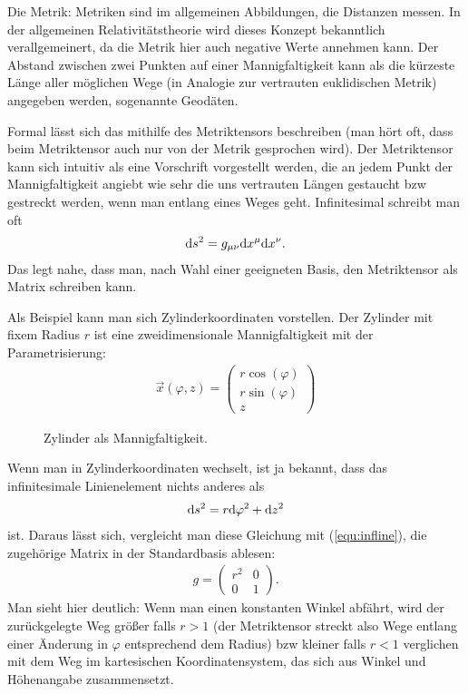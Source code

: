 \documentclass{scrartcl}
\begin{document}
		\begin{paragraph}{Die Metrik:} Metriken sind im allgemeinen Abbildungen, die Distanzen messen. In der allgemeinen
			Relativitätstheorie wird dieses Konzept bekanntlich verallgemeinert, da die Metrik hier auch negative
			Werte annehmen kann. Der Abstand zwischen zwei Punkten auf einer Mannigfaltigkeit kann als die kürzeste Länge 
			aller möglichen Wege (in Analogie zur vertrauten euklidischen Metrik) angegeben werden, sogenannte Geodäten.
			
			Formal lässt sich das mithilfe des Metriktensors beschreiben (man hört oft, dass beim Metriktensor auch nur von
			der Metrik gesprochen wird). Der Metriktensor kann sich intuitiv als eine Vorschrift vorgestellt werden, die an jedem
			Punkt der Mannigfaltigkeit angiebt wie sehr die uns vertrauten Längen gestaucht bzw gestreckt werden, wenn 
			man entlang eines Weges geht. Infinitesimal schreibt man oft
			\begin{align}
				{\rm d}s^2=g_{\mu\nu} {\rm d}x^\mu{\rm d}x^\nu.
				\label{equ:infline}
			\end{align}
			Das legt nahe, dass man, nach Wahl einer geeigneten Basis, den Metriktensor als Matrix schreiben kann.
			
			Als Beispiel kann man sich Zylinderkoordinaten vorstellen. Der Zylinder mit fixem Radius $r$ ist eine 
			zweidimensionale Mannigfaltigkeit mit der Parametrisierung:
			\begin{align}
				\vec{x}(\varphi,z)=\left( 
				\begin{array}{c}
				r\cos(\varphi)\\
				r\sin(\varphi)\\
				z
				\end{array}
				\right)
			\end{align}
			\begin{figure}
				\centering
				
				\caption{Zylinder als Mannigfaltigkeit.}
			\end{figure}
			Wenn man in Zylinderkoordinaten wechselt, ist ja bekannt, dass das infinitesimale Linienelement nichts anderes als
			\begin{align*}
				{\rm d}s^2=r{\rm d}\varphi^2 + {\rm d}z^2
			\end{align*}
			ist. Daraus lässt sich, vergleicht man diese Gleichung mit (\ref{equ:infline}), die zugehörige Matrix in der Standardbasis ablesen:
			\begin{align*}
				g=\left(\begin{array}{ccc} r^2 & 0\\0 & 1 \end{array}\right).
			\end{align*}
			Man sieht hier deutlich: Wenn man einen konstanten Winkel abfährt, wird der zurückgelegte Weg größer falls $r>1$ (der Metriktensor streckt also
			Wege entlang einer Änderung in $\varphi$ entsprechend dem Radius) bzw kleiner falls $r<1$ verglichen mit dem Weg im kartesischen Koordinatensystem,
			das sich aus Winkel und Höhenangabe zusammensetzt.
		\end{paragraph}
\end{document}

